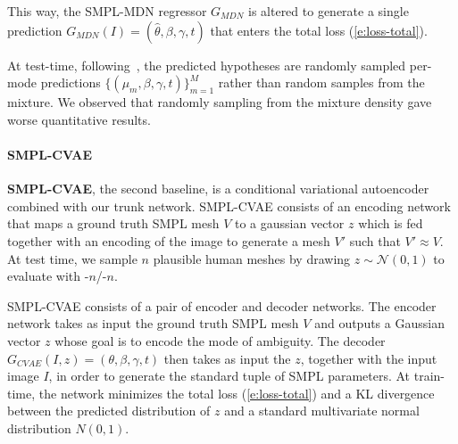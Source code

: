 This way, the SMPL-MDN regressor $G_{MDN}$ is altered to generate a single prediction $G_{MDN}(I) = (\hat \theta, \beta, \gamma, t)$ that enters the total loss (\ref{e:loss-total}).

At test-time, following~\cite{li19generating}, the predicted hypotheses are randomly sampled per-mode predictions $\{(\mu_m, \beta, \gamma, t)\}_{m=1}^M$ rather than random samples from the mixture. We observed that randomly sampling from the mixture density gave worse quantitative results.

\paragraph{SMPL-CVAE} 

\textbf{SMPL-CVAE}, the second baseline, is a conditional variational autoencoder~\cite{sohn2015cvae} combined with our trunk network.
SMPL-CVAE consists of an encoding network that maps a ground truth SMPL mesh $V$ to a gaussian vector $z$ which is fed together with an encoding of the image to generate a mesh $V'$ such that $V' \approx V$. At test time, we sample $n$ plausible human meshes by drawing $z \sim \mathcal{N}(0, 1)$ to evaluate with \MPJPE-$n$/\RE-$n$.

SMPL-CVAE consists of a pair of encoder and decoder networks. The encoder network takes as input the ground truth SMPL mesh $V$ and outputs a Gaussian vector $z$ whose goal is to encode the mode of ambiguity. The decoder $G_{CVAE}(I, z) = (\theta, \beta, \gamma, t)$ then takes as input the $z$, together with the input image $I$, in order to generate the standard tuple of SMPL parameters. At train-time, the network minimizes the total loss (\ref{e:loss-total}) and a KL divergence between the predicted distribution of $z$ and a standard multivariate normal distribution $N(0,1)$.



